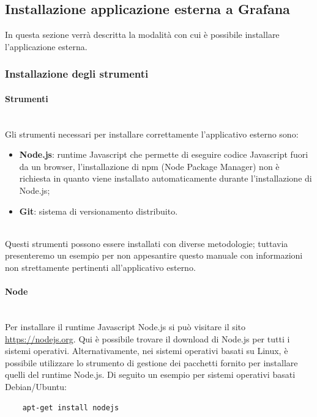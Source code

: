 \subsection{Installazione applicazione esterna a Grafana}
In questa sezione verrà descritta la modalità con cui è possibile installare l'applicazione esterna.

\subsubsection{Installazione degli strumenti}
\paragraph{Strumenti}\mbox{}\\ [1mm]
Gli strumenti necessari per installare correttamente l'applicativo esterno sono:
\begin{itemize}
    \item \textbf{Node.js}: runtime Javascript che permette di eseguire codice Javascript fuori da un browser, l'installazione di npm (Node Package Manager) non è richiesta in quanto viene installato automaticamente durante l'installazione di Node.js;
    \item \textbf{Git}: sistema di versionamento distribuito.
\end{itemize}
\mbox{}\\ [1mm]
Questi strumenti possono essere installati con diverse metodologie; tuttavia presenteremo un esempio per non appesantire questo manuale con informazioni non strettamente pertinenti all'applicativo esterno.

\paragraph{Node}\mbox{}\\ [1mm]
Per installare il runtime Javascript Node.js si può visitare il sito \url{https://nodejs.org}. Qui è possibile trovare il download di Node.js per tutti i sistemi operativi. Alternativamente, nei sistemi operativi basati su Linux, è possibile utilizzare lo strumento di gestione dei pacchetti fornito per installare quelli del runtime Node.js. Di seguito un esempio per sistemi operativi basati Debian/Ubuntu: \\
\begin{verbatim}
    apt-get install nodejs
\end{verbatim}

